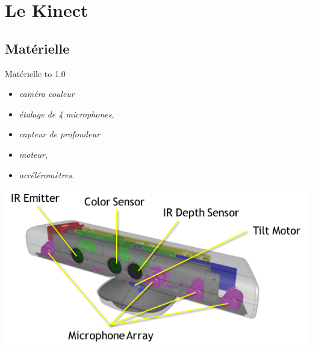 \section{Le Kinect}

\begin{frame}
\end{frame}

\subsection{Matérielle}
\begin{frame}{Matérielle}
\vbox to 1.0\textheight
{
  \begin{minipage}[t]{0.49\linewidth}
    \begin{itemize}
    \item<1-> \emph{caméra couleur}
    \item<2-> \emph{étalage de 4 microphones},
    \end{itemize}
  \end{minipage} 
  \begin{minipage}[t]{0.49\linewidth}
    \begin{itemize}
    \item<3-> \emph{capteur de profondeur}
    \item<4-> \emph{moteur},
    \item<4-> \emph{accéléromètres}.
    \end{itemize}
  \end{minipage}
  \vfill
  \begin{center}
    \includegraphics[width=0.65\linewidth]{../images/kinect_specs}
  \end{center}
  \vfill
}
\end{frame}

